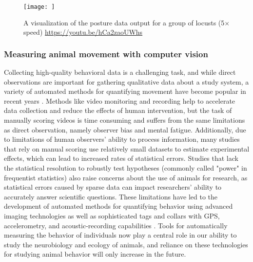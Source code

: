 \documentclass[11pt,a4paper,oneside]{article}
\begin{document}
\begin{figure}
    \centering
    \texttt{[image: ]}
    \caption{A visualization of the posture data output for a group of locusts (5$\times$ speed) \url{https://youtu.be/hCa2zaoUWhs}
}
\end{figure}

\subsubsection{Measuring animal movement with computer vision}
Collecting high-quality behavioral data is a challenging task, and while direct observations are important for gathering qualitative data about a study system, a variety of automated methods for quantifying movement have become popular in recent years \citep{dell2014automated, anderson2014toward, kays2015terrestrial}. Methods like video monitoring and recording help to accelerate data collection and reduce the effects of human intervention, but the task of manually scoring videos is time consuming and suffers from the same limitations as direct observation, namely observer bias and mental fatigue. Additionally, due to limitations of human observers' ability to process information, many studies that rely on manual scoring use relatively small datasets to estimate experimental effects, which can lead to increased rates of statistical errors. Studies that lack the statistical resolution to robustly test hypotheses (commonly called "power" in frequentist statistics) also raise concerns about the use of animals for research, as statistical errors caused by sparse data can impact researchers' ability to accurately answer scientific questions. These limitations have led to the development of automated methods for quantifying behavior using advanced imaging technologies \citep{dell2014automated} as well as sophisticated tags and collars with GPS, accelerometry, and acoustic-recording capabilities \citep{kays2015terrestrial}. Tools for automatically measuring the behavior of individuals now play a central role in our ability to study the neurobiology and ecology of animals, and reliance on these technologies for studying animal behavior will only increase in the future.
\end{document}
